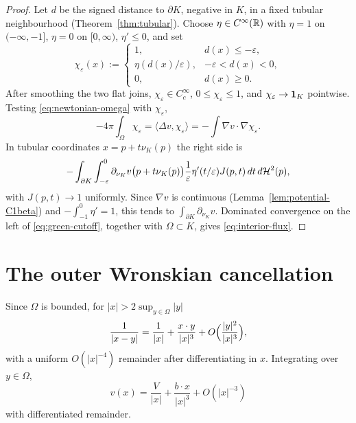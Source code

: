 \begin{proof}
Let $d$ be the signed distance to $\partial K$, negative in $K$, in a fixed
tubular neighbourhood (Theorem~\ref{thm:tubular}).  Choose
$\eta\in C^\infty(\mathbb R)$ with $\eta=1$ on $(-\infty,-1]$, $\eta=0$ on
$[0,\infty)$, $\eta'\le0$, and set
\begin{equation}\label{eq:tubular-cutoff}
  \chi_\varepsilon(x):=
  \begin{cases}
    1,&d(x)\le-\varepsilon,\\
    \eta(d(x)/\varepsilon),&-\varepsilon<d(x)<0,\\
    0,&d(x)\ge0 .
  \end{cases}
\end{equation}
After smoothing the two flat joins, $\chi_\varepsilon\in C^\infty_c$,
$0\le\chi_\varepsilon\le1$, and $\chi_\varepsilon\to\mathbf 1_{K}$ pointwise.  Testing
\eqref{eq:newtonian-omega} with $\chi_\varepsilon$,
\begin{equation}\label{eq:green-cutoff}
  -4\pi\int_\Omega\chi_\varepsilon
  =\langle\Delta v,\chi_\varepsilon\rangle
  =-\int\nabla v\cdot\nabla\chi_\varepsilon .
\end{equation}
In tubular coordinates $x=p+t\nu_K(p)$ the right side is
\[
  -\int_{\partial K}\int_{-\varepsilon}^0
    \partial_{\nu_K}v\bigl(p+t\nu_K(p)\bigr)
    \frac1\varepsilon\eta'(t/\varepsilon)J(p,t)\,dt\,d\mathcal H^2(p),
\]
with $J(p,t)\to1$ uniformly.  Since $\nabla v$ is continuous
(Lemma~\ref{lem:potential-C1beta}) and $-\int_{-1}^0\eta'=1$, this tends to
$\int_{\partial K}\partial_{\nu_K}v$.  Dominated convergence on the left of
\eqref{eq:green-cutoff}, together with $\Omega\subset K$, gives
\eqref{eq:interior-flux}.
\end{proof}

\section{The outer Wronskian cancellation}

\begin{lemma}\label{lem:v-expansion}
Since $\Omega$ is bounded, for $|x|>2\sup_{y\in\Omega}|y|$
\begin{equation}\label{eq:kernel-expansion}
  \frac1{|x-y|}=\frac1{|x|}+\frac{x\cdot y}{|x|^3}
    +O\Bigl(\frac{|y|^2}{|x|^3}\Bigr),
\end{equation}
with a uniform $O(|x|^{-4})$ remainder after differentiating in $x$.
Integrating over $y\in\Omega$,
\begin{equation}\label{eq:v-expansion}
  v(x)=\frac V{|x|}+\frac{b\cdot x}{|x|^3}+O(|x|^{-3})
\end{equation}
with differentiated remainder.
\end{lemma}

